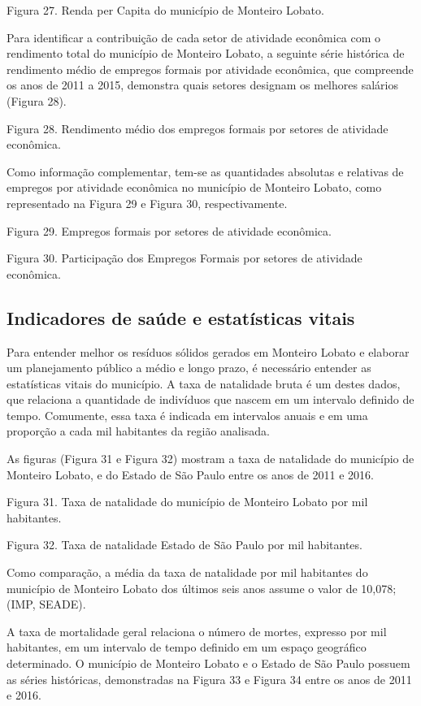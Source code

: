 Figura 27. Renda per Capita do município de Monteiro Lobato.

Para identificar a contribuição de cada setor de atividade econômica com o rendimento total do município de Monteiro Lobato, a seguinte série histórica de rendimento médio de empregos formais por atividade econômica, que compreende os anos de 2011 a 2015, demonstra quais setores designam os melhores salários (Figura 28).
 
Figura 28. Rendimento médio dos empregos formais por setores de atividade econômica.

Como informação complementar, tem-se as quantidades absolutas e relativas de empregos por atividade econômica no município de Monteiro Lobato, como representado na Figura 29 e Figura 30, respectivamente.
 
Figura 29. Empregos formais por setores de atividade econômica.
 
Figura 30. Participação dos Empregos Formais por setores de atividade econômica.

\subsection{Indicadores de saúde e estatísticas vitais}

Para entender melhor os resíduos sólidos gerados em Monteiro Lobato e elaborar um planejamento público a médio e longo prazo, é necessário entender as estatísticas vitais do município. A taxa de natalidade bruta é um destes dados, que relaciona a quantidade de indivíduos que nascem em um intervalo definido de tempo. Comumente, essa taxa é indicada em intervalos anuais e em uma proporção a cada mil habitantes da região analisada. 

As figuras (Figura 31 e Figura 32) mostram a taxa de natalidade do município de Monteiro Lobato, e do Estado de São Paulo entre os anos de 2011 e 2016.
 
Figura 31. Taxa de natalidade do município de Monteiro Lobato por mil habitantes.

Figura 32. Taxa de natalidade Estado de São Paulo por mil habitantes.

Como comparação, a média da taxa de natalidade por mil habitantes do município de Monteiro Lobato dos últimos seis anos assume o valor de 10,078; (IMP, SEADE).

A taxa de mortalidade geral relaciona o número de mortes, expresso por mil habitantes, em um intervalo de tempo definido em um espaço geográfico determinado. O município de Monteiro Lobato e o Estado de São Paulo possuem as séries históricas, demonstradas na Figura 33 e Figura 34 entre os anos de 2011 e 2016.

